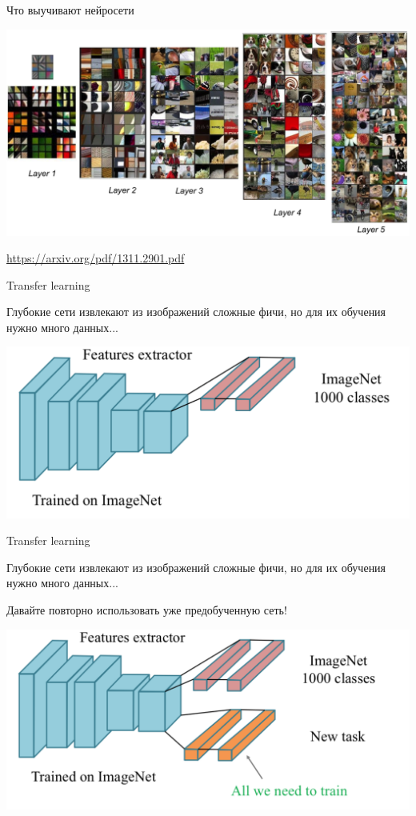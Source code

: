 \documentclass[notes,12pt, aspectratio=169]{beamer}
\newenvironment{wideitemize}{\itemize\addtolength{\itemsep}{10pt}}{\enditemize}
\begin{document}
\begin{frame}{Что выучивают нейросети}
\begin{center}
\includegraphics[width=.9\linewidth]{cnn_vis.png}
\end{center}
\vfill 
\small{\url{https://arxiv.org/pdf/1311.2901.pdf}}
\end{frame}


\begin{frame}{Transfer learning}
\begin{wideitemize}
	\item  Глубокие сети извлекают из изображений сложные фичи, но для их обучения нужно много данных...
\end{wideitemize}

\begin{center}
	\includegraphics[width=.8\linewidth]{transfer_learning1.png}
\end{center}
\end{frame}


\begin{frame}{Transfer learning}
\begin{wideitemize}
	\item  Глубокие сети извлекают из изображений сложные фичи, но для их обучения нужно много данных...
	\item  Давайте повторно использовать уже предобученную сеть!
\end{wideitemize}

\begin{center}
	\includegraphics[width=.8\linewidth]{transfer_learning2.png}
\end{center}
\end{frame}
\end{document}
